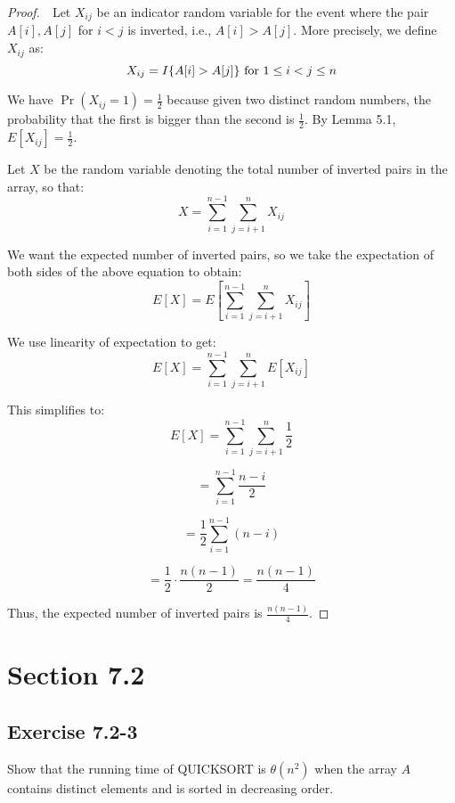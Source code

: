 \documentclass{article}
\begin{document}
\begin{proof}
    $ $\newline
    $ $\newline
    Let $X_{ij}$ be an indicator random variable for the event where the pair $A[i], A[j]$ for $i < j$ is inverted, i.e., $A[i] > A[j]$. 
    More precisely, we define $X_{ij}$ as:
    \[ X_{ij} = I\{A[i] > A[j]\} \text{ for } 1 \leq i < j \leq n \\
    \]
    
    We have $\Pr(X_{ij} = 1) = \frac{1}{2}$ because given two distinct random numbers, the probability that the first is bigger than the second is $\frac{1}{2}$. 
    By Lemma 5.1, $E[X_{ij}] = \frac{1}{2}$.
    
    Let $X$ be the random variable denoting the total number of inverted pairs in the array, so that:
    \[ X = \sum_{i=1}^{n-1} \sum_{j=i+1}^{n} X_{ij}
    \]
    
    We want the expected number of inverted pairs, so we take the expectation of both sides of the above equation to obtain:
    \[ E[X] = E\left[ \sum_{i=1}^{n-1} \sum_{j=i+1}^{n} X_{ij} \right]
    \]
    
    We use linearity of expectation to get:
    \[ E[X] = \sum_{i=1}^{n-1} \sum_{j=i+1}^{n} E[X_{ij}]
    \]
    
    This simplifies to:
    \[ E[X] = \sum_{i=1}^{n-1} \sum_{j=i+1}^{n} \frac{1}{2}
    \]
    
    \[     = \sum_{i=1}^{n-1} \frac{n - i}{2}
    \]
    
    \[     = \frac{1}{2} \sum_{i=1}^{n-1} (n - i)
    \]
    
    \[     = \frac{1}{2} \cdot \frac{n(n-1)}{2} = \frac{n(n-1)}{4}
    \]
    
    Thus, the expected number of inverted pairs is $\frac{n(n-1)}{4}$.
\end{proof}

\clearpage %

\section*{Section 7.2}
\subsection*{Exercise 7.2-3}
%
Show that the running time of QUICKSORT is $\theta (n^2)$ when the array $A$ contains distinct elements and is sorted in decreasing order.
\end{document}
